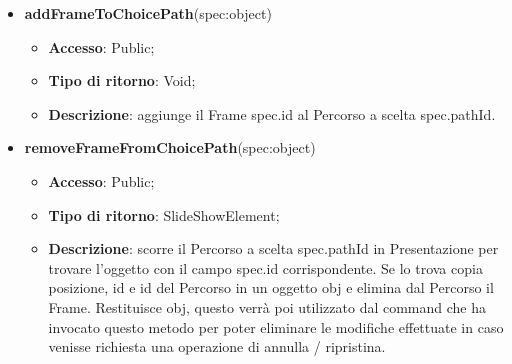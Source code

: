 {\begin{itemize}
\begin{itemize}
				\item \textbf{Tipo di ritorno}: SlideShowElement;
				\item \textbf{Descrizione}: metodo che elimina il Percorso a scelta pathId da Presentazione e ritorna l'oggetto eliminato, questo verrà poi utilizzato dal command che ha invocato questo metodo per poter eliminare le modifiche effettuate in caso venisse richiesta una operazione di annulla / ripristina.
			\end{itemize}
			\item \textbf{addFrameToChoicePath}(spec:object)
			\begin{itemize}
				\item \textbf{Accesso}: Public;
				\item \textbf{Tipo di ritorno}: Void;
				\item \textbf{Descrizione}: aggiunge il Frame spec.id al Percorso a scelta spec.pathId.
			\end{itemize}
			\item \textbf{removeFrameFromChoicePath}(spec:object)
			\begin{itemize}
				\item \textbf{Accesso}: Public;
				\item \textbf{Tipo di ritorno}: SlideShowElement;
				\item \textbf{Descrizione}: scorre il Percorso a scelta spec.pathId in Presentazione per trovare l’oggetto con il campo spec.id corrispondente. Se lo trova copia posizione, id e id del Percorso in un oggetto obj e elimina dal Percorso\ped{g} il Frame. Restituisce obj, questo verrà poi utilizzato dal command che ha invocato questo metodo per poter eliminare le modifiche effettuate in caso venisse richiesta una operazione di annulla / ripristina.
			\end{itemize}
		\end{itemize}
		
	}
